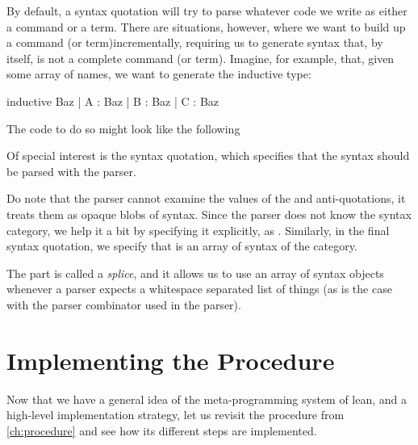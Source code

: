 By default, a syntax quotation will try to parse whatever code we write as either a command or a term. There are situations, however, where we want to build up a command (or term)incrementally, requiring us to generate syntax that, by itself, is not a complete command (or term). Imagine, for example, that, given some array \lean{[`A, `B, `C]} of names, we want to generate the inductive type:
\begin{leancode}
    inductive Baz
      | A : Baz
      | B : Baz
      | C : Baz
\end{leancode}
The code to do so might look like the following
Of special interest is the  syntax quotation, which specifies that the syntax should be parsed with the  parser.

Do note that the parser cannot examine the values of the  and  anti-quotations, it treats them as opaque blobs of syntax. Since the parser does not know the syntax category, we help it a bit by specifying it explicitly, as .
Similarly, in the final \inductive{} syntax quotation, we specify that  is an array of syntax of the  category.

The \lean{\$[...]*} part is called a \emph{splice}, and it allows us to use an array of syntax objects whenever a parser expects a whitespace separated list of things (as is the case with the  parser combinator used in the \inductive{} parser).



\section{Implementing the Procedure}
\label{sec:implementing}

Now that we have a general idea of the meta-programming system of lean, and a high-level implementation strategy, let us revisit the procedure from \ref{ch:procedure} and see how its different steps are implemented.

